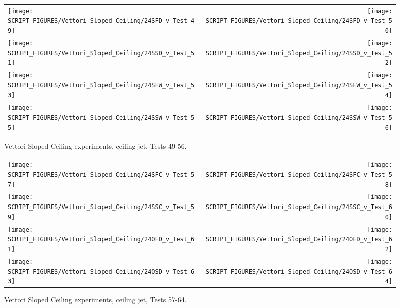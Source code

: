 \begin{figure}[p]
\begin{tabular*}{\textwidth}{l@{\extracolsep{\fill}}r}
\texttt{[image: SCRIPT\_FIGURES/Vettori\_Sloped\_Ceiling/24SFD\_v\_Test\_49]} &
\texttt{[image: SCRIPT\_FIGURES/Vettori\_Sloped\_Ceiling/24SFD\_v\_Test\_50]} \\
\texttt{[image: SCRIPT\_FIGURES/Vettori\_Sloped\_Ceiling/24SSD\_v\_Test\_51]} &
\texttt{[image: SCRIPT\_FIGURES/Vettori\_Sloped\_Ceiling/24SSD\_v\_Test\_52]} \\
\texttt{[image: SCRIPT\_FIGURES/Vettori\_Sloped\_Ceiling/24SFW\_v\_Test\_53]} &
\texttt{[image: SCRIPT\_FIGURES/Vettori\_Sloped\_Ceiling/24SFW\_v\_Test\_54]} \\
\texttt{[image: SCRIPT\_FIGURES/Vettori\_Sloped\_Ceiling/24SSW\_v\_Test\_55]} &
\texttt{[image: SCRIPT\_FIGURES/Vettori\_Sloped\_Ceiling/24SSW\_v\_Test\_56]} \\
\end{tabular*}
\caption[Vettori Sloped Ceiling experiments, ceiling jet, Tests 49-56]{Vettori Sloped Ceiling experiments, ceiling jet, Tests 49-56.}
\label{Vettori_Sloped_7}
\end{figure}

\begin{figure}[p]
\begin{tabular*}{\textwidth}{l@{\extracolsep{\fill}}r}
\texttt{[image: SCRIPT\_FIGURES/Vettori\_Sloped\_Ceiling/24SFC\_v\_Test\_57]} &
\texttt{[image: SCRIPT\_FIGURES/Vettori\_Sloped\_Ceiling/24SFC\_v\_Test\_58]} \\
\texttt{[image: SCRIPT\_FIGURES/Vettori\_Sloped\_Ceiling/24SSC\_v\_Test\_59]} &
\texttt{[image: SCRIPT\_FIGURES/Vettori\_Sloped\_Ceiling/24SSC\_v\_Test\_60]} \\
\texttt{[image: SCRIPT\_FIGURES/Vettori\_Sloped\_Ceiling/24OFD\_v\_Test\_61]} &
\texttt{[image: SCRIPT\_FIGURES/Vettori\_Sloped\_Ceiling/24OFD\_v\_Test\_62]} \\
\texttt{[image: SCRIPT\_FIGURES/Vettori\_Sloped\_Ceiling/24OSD\_v\_Test\_63]} &
\texttt{[image: SCRIPT\_FIGURES/Vettori\_Sloped\_Ceiling/24OSD\_v\_Test\_64]} \\
\end{tabular*}
\caption[Vettori Sloped Ceiling experiments, ceiling jet, Tests 57-64]{Vettori Sloped Ceiling experiments, ceiling jet, Tests 57-64.}
\label{Vettori_Sloped_8}
\end{figure}

